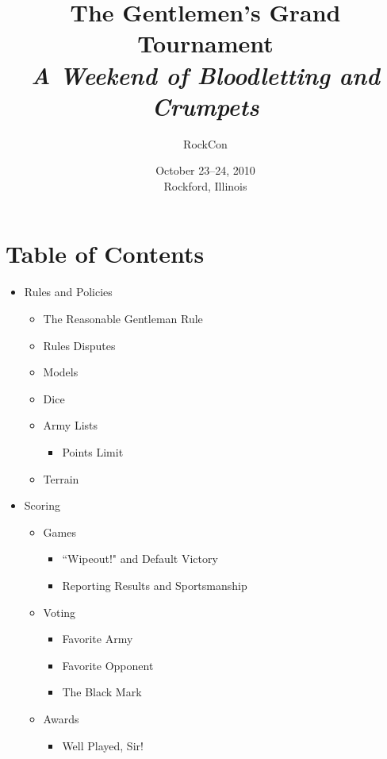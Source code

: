 \documentclass[12pt,titlepage]{article}
\begin{document}
\begin{titlepage}
\title{The Gentlemen's Grand Tournament\\{\large\textit{A Weekend of Bloodletting and Crumpets}}}
\author{RockCon}
\date{October 23--24, 2010\\Rockford, Illinois}
\maketitle
\end{titlepage}

\section*{Table of Contents}

\begin{itemize}
\item Rules and Policies
  \begin{itemize}
  \item The Reasonable Gentleman Rule
  \item Rules Disputes
  \item Models
  \item Dice
  \item Army Lists
    \begin{itemize}
    \item Points Limit
    \end{itemize}
  \item Terrain
  \end{itemize}
\item Scoring
  \begin{itemize}
  \item Games
    \begin{itemize}
    \item ``Wipeout!" and Default Victory
    \item Reporting Results and Sportsmanship
    \end{itemize}
  \item Voting
    \begin{itemize}
    \item Favorite Army
    \item Favorite Opponent
    \item The Black Mark
    \end{itemize}
  \item Awards
    \begin{itemize}
    \item Well Played, Sir!

\end{itemize}
\end{itemize}
\end{itemize}
\end{document}
